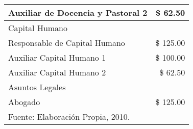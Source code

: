 \begin{table}
\begin{tabular}{l|r}
        \hspace{1em} Auxiliar de Docencia y Pastoral 2  & \$  62.50                     \\
        \hline
        \multicolumn{2}{l}{Capital Humano}                                              \\
        \hline
        \hspace{1em} Responsable de Capital Humano      & \$ 125.00                     \\
        \hspace{1em} Auxiliar Capital Humano 1          & \$ 100.00                     \\
        \hspace{1em} Auxiliar Capital Humano 2          & \$  62.50                     \\
        \hline
        \multicolumn{2}{l}{Asuntos Legales}                                             \\
        \hline
        \hspace{1em} Abogado                            & \$ 125.00                     \\
        \hline
        \multicolumn{2}{l}{\footnotesize Fuente: Elaboración Propia, 2010.}
    \end{tabular}
\end{table}
